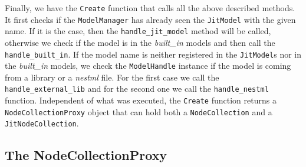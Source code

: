 Finally, we have the \texttt{Create} function that calls all the above described methods. It first checks if the \texttt{ModelManager} has already seen the \texttt{JitModel} with the given name. If it is the case, then the \texttt{handle\_jit\_model} method will be called, otherwise we check if the model is in the \emph{built\_in} models and then call the  \texttt{handle\_built\_in}. If the model name is neither registered in the \texttt{JitModel}s nor in the \emph{built\_in} models, we check the \texttt{ModelHandle} instance if the model is coming from a library or a \emph{nestml} file. For the first case we call the  \texttt{handle\_external\_lib} and for the second one we call the  \texttt{handle\_nestml} function. Independent of what was executed, the \texttt{Create} function returns a \texttt{NodeCollectionProxy} object that can hold both a \texttt{NodeCollection} and a \texttt{JitNodeCollection}. 

\subsection{The NodeCollectionProxy}

